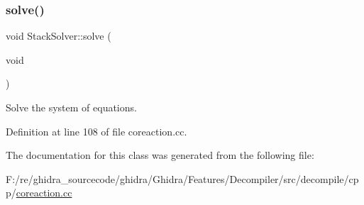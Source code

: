 \subsubsection{\texorpdfstring{solve()}{solve()}}
{\footnotesize\ttfamily void Stack\+Solver\+::solve (\begin{DoxyParamCaption}\item[{void}]{ }\end{DoxyParamCaption})}



Solve the system of equations. 



Definition at line 108 of file coreaction.\+cc.



The documentation for this class was generated from the following file\+:\begin{DoxyCompactItemize}
\item 
F\+:/re/ghidra\+\_\+sourcecode/ghidra/\+Ghidra/\+Features/\+Decompiler/src/decompile/cpp/\mbox{\hyperlink{coreaction_8cc}{coreaction.\+cc}}\end{DoxyCompactItemize}
